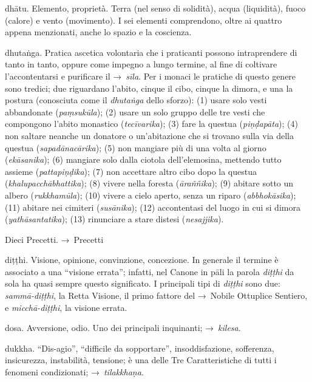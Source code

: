\begin{glossarydescription}
\item[dhātu.] Elemento, proprietà. Terra (nel senso di solidità), acqua
  (liquidità), fuoco (calore) e vento (movimento). I sei elementi comprendono,
  oltre ai quattro appena menzionati, anche lo spazio e la coscienza.

\item[dhutaṅga.]\label{glossary-dhutanga} Pratica ascetica volontaria che i praticanti possono
  intraprendere di tanto in tanto, oppure come impegno a lungo termine, al fine
  di coltivare l'accontentarsi e purificare il →~\emph{sīla}. Per i monaci le
  pratiche di questo genere sono tredici; due riguardano l'abito, cinque il
  cibo, cinque la dimora, e una la postura (conosciuta come il \emph{dhutaṅga}
  dello sforzo): (1) usare solo vesti abbandonate (\emph{paṃsukūla}); (2) usare
  un solo gruppo delle tre vesti che compongono l'abito monastico
  (\emph{tecīvarika}); (3) fare la questua (\emph{piṇḍapāta}); (4) non saltare
  neanche un donatore o un'abitazione che si trovano sulla via della questua
  (\emph{sapadānacārika}); (5) non mangiare più di una volta al giorno
  (\emph{ekāsanika}); (6) mangiare solo dalla ciotola dell'elemosina, mettendo
  tutto assieme (\emph{pattapiṇḍika}); (7) non accettare altro cibo dopo la
  questua (\emph{khalupacchābhattika}); (8) vivere nella foresta
  (\emph{āraññika}); (9) abitare sotto un albero (\emph{rukkhamūla}); (10)
  vivere a cielo aperto, senza un riparo (\emph{abbhokāsika}); (11) abitare nei
  cimiteri (\emph{susānika}); (12) accontentasi del luogo in cui si dimora
  (\emph{yathāsantatika}); (13) rinunciare a stare distesi (\emph{nesajjika}).

\item[Dieci Precetti.] →~Precetti

\item[diṭṭhi.] Visione, opinione, convinzione, concezione. In generale il
  termine è associato a una ``visione errata''; infatti, nel Canone in pāli la
  parola \emph{diṭṭhi} da sola ha quasi sempre questo significato. I principali
  tipi di \emph{diṭṭhi} sono due: \emph{sammā-diṭṭhi}, la Retta Visione, il
  primo fattore del →~Nobile Ottuplice Sentiero, e \emph{micchā-diṭṭhi}, la
  visione errata.

\item[dosa.] Avversione, odio. Uno dei principali inquinanti;
  →~\emph{kilesa}.

\item[dukkha.] ``Dis-agio'', ``difficile da sopportare'', insoddisfazione,
  sofferenza, insicurezza, instabilità, tensione; è una delle Tre
  Caratteristiche di tutti i fenomeni condizionati; →~\emph{tilakkhaṇa}.


\end{glossarydescription}
